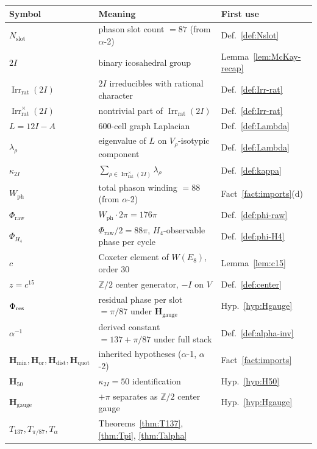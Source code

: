 \documentclass[11pt, a4paper]{amsart}
\theoremstyle{definition}
\newcommand{\Z}{\mathbb{Z}}
\newcommand{\Irr}{\operatorname{Irr}}
\newcommand{\Hmin}{\mathbf{H}_{\min}}
\newcommand{\Hor}{\mathbf{H}_{\mathrm{or}}}
\newcommand{\Hdist}{\mathbf{H}_{\mathrm{dist}}}
\newcommand{\Hquot}{\mathbf{H}_{\mathrm{quot}}}
\newcommand{\Hfifty}{\mathbf{H}_{50}}
\newcommand{\Hgauge}{\mathbf{H}_{\mathrm{gauge}}}
\newcommand{\Wph}{W_{\mathrm{ph}}}
\newcommand{\Nslot}{N_{\mathrm{slot}}}
\newcommand{\kappaTwoI}{\kappa_{2I}}
\newcommand{\Phiraw}{\Phi_{\mathrm{raw}}}
\newcommand{\PhiHfour}{\Phi_{H_4}}
\newcommand{\Irrrat}{\Irr_{\mathrm{rat}}}
\begin{document}
\begin{center}
\begin{tabular}{|l|l|l|}
\hline
Symbol & Meaning & First use \\
\hline
$\Nslot$ & phason slot count $= 87$ (from $\alpha$-2) &
  Def.~\ref{def:Nslot} \\
$2I$ & binary icosahedral group &
  Lemma~\ref{lem:McKay-recap} \\
$\Irrrat(2I)$ & $2I$ irreducibles with rational character &
  Def.~\ref{def:Irr-rat} \\
$\Irrrat^\times(2I)$ & nontrivial part of $\Irrrat(2I)$ &
  Def.~\ref{def:Irr-rat} \\
$L = 12 I - A$ & $600$-cell graph Laplacian &
  Def.~\ref{def:Lambda} \\
$\lambda_\rho$ & eigenvalue of $L$ on $V_\rho$-isotypic
  component & Def.~\ref{def:Lambda} \\
$\kappaTwoI$ & $\sum_{\rho \in \Irrrat^\times(2I)}
  \lambda_\rho$ & Def.~\ref{def:kappa} \\
$\Wph$ & total phason winding $= 88$ (from $\alpha$-2) &
  Fact~\ref{fact:imports}(d) \\
$\Phiraw$ & $\Wph \cdot 2\pi = 176\pi$ &
  Def.~\ref{def:phi-raw} \\
$\PhiHfour$ & $\Phiraw / 2 = 88\pi$, $H_4$-observable phase
  per cycle & Def.~\ref{def:phi-H4} \\
$c$ & Coxeter element of $W(E_8)$, order $30$ &
  Lemma~\ref{lem:c15} \\
$z = c^{15}$ & $\Z/2$ center generator, $-I$ on $V$ &
  Def.~\ref{def:center} \\
$\Phi_{\rm res}$ & residual phase per slot $= \pi/87$ under
  $\Hgauge$ & Hyp.~\ref{hyp:Hgauge} \\
$\alpha^{-1}$ & derived constant $= 137 + \pi/87$ under
  full stack & Def.~\ref{def:alpha-inv} \\
$\Hmin, \Hor, \Hdist, \Hquot$ & inherited hypotheses
  ($\alpha$-1, $\alpha$-2) &
  Fact~\ref{fact:imports} \\
$\Hfifty$ & $\kappaTwoI = 50$ identification &
  Hyp.~\ref{hyp:H50} \\
$\Hgauge$ & $+\pi$ separates as $\Z/2$ center gauge &
  Hyp.~\ref{hyp:Hgauge} \\
$T_{137}, T_{\pi/87}, T_\alpha$ &
  Theorems~\ref{thm:T137}, \ref{thm:Tpi},
  \ref{thm:Talpha} & \\
\hline
\end{tabular}
\end{center}
\end{document}
